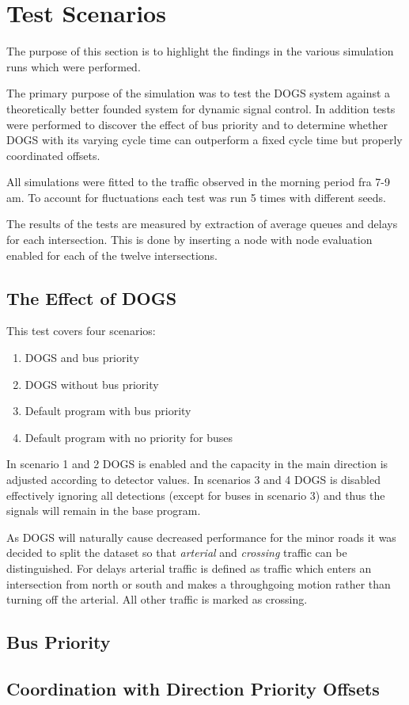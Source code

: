 \section{Test Scenarios}
The purpose of this section is to highlight the findings in the various simulation runs which were performed.

The primary purpose of the simulation was to test the DOGS system against a theoretically better founded system for dynamic signal control. In addition tests were performed to discover the effect of bus priority and to determine whether DOGS with its varying cycle time can outperform a fixed cycle time but properly coordinated offsets.

All simulations were fitted to the traffic observed in the morning period fra 7-9 am.
To account for fluctuations each test was run 5 times with different seeds.

The results of the tests are measured by extraction of average queues and delays for each intersection. This is done by inserting a node with node evaluation enabled for each of the twelve intersections.

\subsection{The Effect of DOGS}
This test covers four scenarios:

\begin{enumerate}
\item DOGS and bus priority
\item DOGS without bus priority
\item Default program with bus priority
\item Default program with no priority for buses
\end{enumerate}

In scenario 1 and 2 DOGS is enabled and the capacity in the main direction is adjusted according to detector values. In scenarios 3 and 4 DOGS is disabled effectively ignoring all detections (except for buses in scenario 3) and thus the signals will remain in the base program.

As DOGS will naturally cause decreased performance for the minor roads it was decided to split the dataset so that \textit{arterial} and \textit{crossing} traffic can be distinguished. For delays arterial traffic is defined as traffic which enters an intersection from north or south and makes a throughgoing motion rather than turning off the arterial. All other traffic is marked as crossing.

\subsection*{Bus Priority}


\subsection{Coordination with Direction Priority Offsets}

